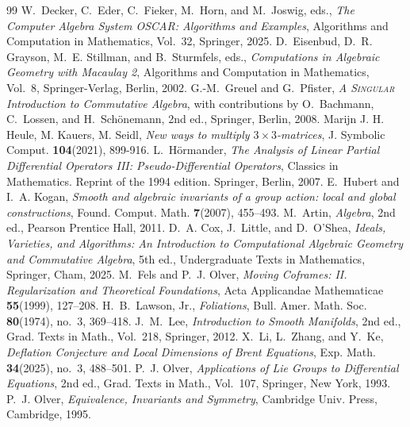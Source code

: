 \documentclass[10pt,a4paper]{amsart}
\numberwithin{equation}{section}
\begin{document}
\begin{thebibliography}{99}
 W.~Decker, C.~Eder, C.~Fieker, M.~Horn, and M.~Joswig, eds., \emph{The Computer Algebra System OSCAR: Algorithms and Examples}, Algorithms and Computation in Mathematics, Vol.~32, Springer, 2025.
 D.~Eisenbud, D.~R. Grayson, M.~E. Stillman, and B.~Sturmfels, eds., \emph{Computations in Algebraic Geometry with Macaulay 2}, Algorithms and Computation in Mathematics, Vol.~8, Springer-Verlag, Berlin, 2002.
 G.-M.~Greuel and G.~Pfister, \emph{A \textsc{Singular} Introduction to Commutative Algebra}, with contributions by O.~Bachmann, C.~Lossen, and H.~Sch\"onemann, 2nd ed., Springer, Berlin, 2008.
 Marijn J. H. Heule, M. Kauers, M. Seidl, \textit{New ways to multiply $3\times3$-matrices}, J. Symbolic Comput. \textbf{104}(2021), 899-916.
 L.~H\"ormander, \emph{The Analysis of Linear Partial Differential Operators III: Pseudo-Differential Operators}, Classics in Mathematics. Reprint of the 1994 edition. Springer, Berlin, 2007.
 E.~Hubert and I.~A. Kogan, \emph{Smooth and algebraic invariants of a group action: local and global constructions}, Found. Comput. Math. \textbf{7}(2007), 455--493.
 M.~Artin, \emph{Algebra}, 2nd ed., Pearson Prentice Hall, 2011.
 D.~A. Cox, J.~Little, and D.~O'Shea, \textit{Ideals, Varieties, and Algorithms: An Introduction to Computational Algebraic Geometry and Commutative Algebra}, 5th ed., Undergraduate Texts in Mathematics, Springer, Cham, 2025.
 M.~Fels and P.~J. Olver, \emph{Moving Coframes: II. Regularization and Theoretical Foundations}, Acta Applicandae Mathematicae \textbf{55}(1999), 127--208. %
 H.~B.~Lawson, Jr., \emph{Foliations}, Bull. Amer. Math. Soc. \textbf{80}(1974), no.~3, 369--418.
 J.~M.~Lee, \emph{Introduction to Smooth Manifolds}, 2nd ed., Grad. Texts in Math., Vol.~218, Springer, 2012.
 X.~Li, L.~Zhang, and Y.~Ke, \emph{Deflation Conjecture and Local Dimensions of Brent Equations}, Exp. Math. \textbf{34}(2025), no.~3, 488--501.
 P.~J. Olver, \textit{Applications of Lie Groups to Differential Equations}, 2nd ed., Grad. Texts in Math., Vol.~107, Springer, New York, 1993.
 P.~J. Olver, \textit{Equivalence, Invariants and Symmetry}, Cambridge Univ. Press, Cambridge, 1995.
\end{thebibliography}
\end{document}
